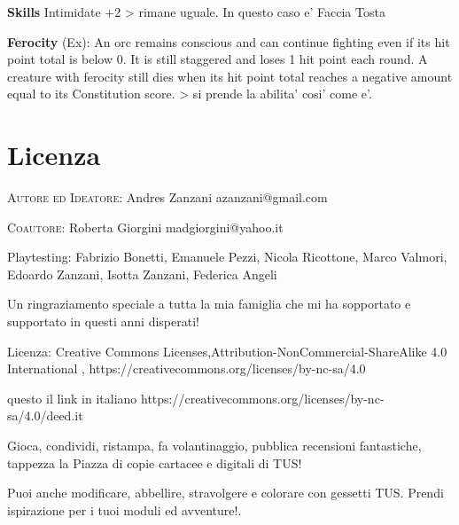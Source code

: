\documentclass[a4paper,11pt,twoside,openany]{book}
\begin{document}
{		\textbf{Skills} Intimidate +2 \textgreater{} rimane uguale. In questo caso e' Faccia Tosta
		
		\textbf{Ferocity} (Ex): An orc remains conscious and can continue fighting even if its hit point total is below 0. It is still staggered and loses 1 hit point each round. A creature with ferocity still dies when its hit point total reaches a negative amount equal to its Constitution score. \textgreater{} si prende la abilita' cosi' come e'.
		
		\pagebreak
		
		\twocolumn
		
		\printindex{}
		
		\pagebreak
		
		\onecolumn
		
		
		\label{indice-analitico}
		
		\pagebreak
		
		\section{Licenza}
		
		\bigskip
		
		\textsc{Autore ed Ideatore}: Andres Zanzani azanzani@gmail.com
		
		\bigskip
		\textsc{Coautore}: Roberta Giorgini madgiorgini@yahoo.it
		
		\bigskip
		
		Playtesting: Fabrizio Bonetti, Emanuele Pezzi, Nicola Ricottone, Marco Valmori, Edoardo Zanzani, Isotta Zanzani, Federica Angeli
		
		\bigskip
		
		Un ringraziamento speciale a tutta la mia famiglia che mi ha sopportato e supportato in questi anni disperati!
		
		\bigskip
		
		Licenza: Creative Commons Licenses,Attribution-NonCommercial-ShareAlike 4.0 International , https://creativecommons.org/licenses/by-nc-sa/4.0
		
		questo il link in italiano https://creativecommons.org/licenses/by-nc-sa/4.0/deed.it
		
		Gioca, condividi, ristampa, fa volantinaggio, pubblica recensioni fantastiche, tappezza la Piazza di copie cartacee e digitali di TUS!
		
		Puoi anche modificare, abbellire, stravolgere e colorare con gessetti TUS. Prendi ispirazione per i tuoi moduli ed avventure!.
		
}
\end{document}
